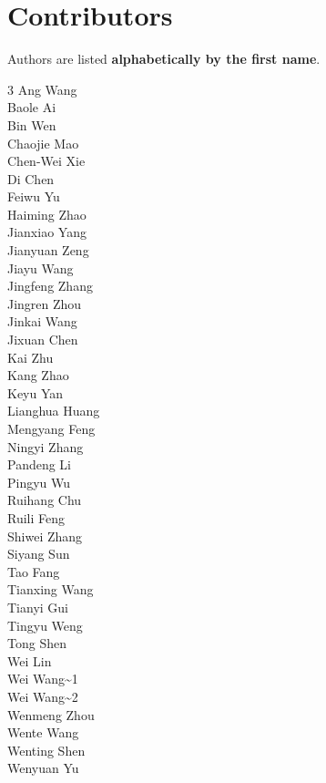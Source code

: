 \section{Contributors}

\large{Authors are listed \textbf{alphabetically by the first name}.} 


\large{
\color{damaired}%
\begin{multicols}{3}
\raggedcolumns
Ang Wang\\
Baole Ai\\
Bin Wen\\
Chaojie Mao\\
Chen-Wei Xie\\
Di Chen\\
Feiwu Yu\\
Haiming Zhao\\
Jianxiao Yang\\
Jianyuan Zeng\\
Jiayu Wang\\
Jingfeng Zhang\\
Jingren Zhou\\
Jinkai Wang\\
Jixuan Chen\\
Kai Zhu\\
Kang Zhao\\
Keyu Yan\\
Lianghua Huang\\
Mengyang Feng\\
Ningyi Zhang\\
Pandeng Li\\
Pingyu Wu\\
Ruihang Chu\\
Ruili Feng\\
Shiwei Zhang\\
Siyang Sun\\
Tao Fang\\
Tianxing Wang\\
Tianyi Gui\\
Tingyu Weng\\
Tong Shen\\
Wei Lin\\
Wei Wang\textasciitilde1\\
Wei Wang\textasciitilde2\\
Wenmeng Zhou\\
Wente Wang\\
Wenting Shen\\
Wenyuan Yu\\

\end{multicols}}
